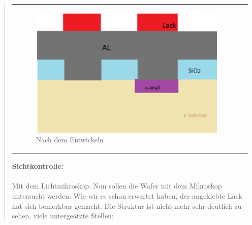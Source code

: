 \begin{quote}
\begin{center}
\begin{tabular}{ll}
\begin{minipage}{0.7\textwidth}
                    \end{minipage}
                    \begin{minipage}{0.6\textwidth}

                        \begin{figure}[H]
                        \hspace{0em}
                            \includegraphics[scale=0.9, trim = 0cm 0cm 0cm
                            0cm, clip]
                            {./HerstellungBilder/NachdemEntwickeln.png}
                            \caption{Nach dem Entwickeln}
                           \label{fig:nachentw}
                        \end{figure}
                    \vspace{-1.5em}

                    \end{minipage}

                \end{tabular}
			\end{center}

    		\vspace{2em}

    		\textbf{Sichtkontrolle:}\\
			\\
			Mit dem Lichtmikroskop: Nun sollen die Wafer mit dem Mikroskop
			untersucht werden. Wie wir es schon erwartet haben, der angeklebte
			Lack hat sich bemerkbar gemacht: Die Struktur ist nicht mehr sehr
			deutlich zu sehen, viele untergeätzte Stellen:

            \vspace{2em}


\end{quote}

